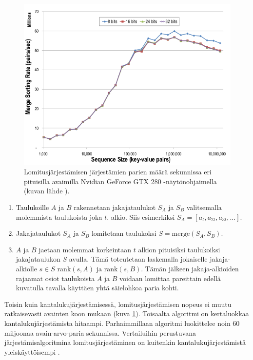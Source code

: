 \documentclass[a4paper,11pt]{article}
\begin{document}
\begin{figure}
\centering
\includegraphics[scale = 0.45]{satish_mergesort}
\caption{Lomitusjärjestämisen järjestämien parien määrä sekunnissa eri pituisilla avaimilla Nvidian GeForce GTX 280 -näytönohjaimella (kuvan lähde \cite{satish2009}).}
\label{fig:merge_sort_varying_key_size}
\end{figure}

\begin{singlespace*}
\begin{enumerate}
\item Taulukoille $A$ ja $B$ rakennetaan jakajataulukot $S_A$ ja $S_B$ valitsemalla molemmista taulukoista joka $t$. alkio. Siis esimerkiksi $S_A = [a_t, a_{2t}, a_{3t}, ...]$.
\item Jakajataulukot $S_A$ ja $S_B$ lomitetaan taulukoksi $S = \mathrm{merge}(S_A, S_B)$.
\item $A$ ja $B$ jaetaan molemmat korkeintaan $t$ alkion pituisiksi taulukoiksi jakajataulukon $S$ avulla. Tämä toteutetaan laskemalla jokaiselle jakaja-alkiolle $s \in S$ $\mathrm{rank}(s, A)$ ja $\mathrm{rank}(s, B)$. Tämän jälkeen jakaja-alkioiden rajaamat osiot taulukoista $A$ ja $B$ voidaan lomittaa pareittain edellä kuvatulla tavalla käyttäen yhtä säielohkoa paria kohti.
\end{enumerate}
\end{singlespace*}

Toisin kuin kantalukujärjestämisessä, lomitusjärjestämisen nopeus ei muutu ratkaisevasti avainten koon mukaan (kuva \ref{fig:merge_sort_varying_key_size}). Toisaalta algoritmi on kertaluokkaa kantalukujärjestämista hitaampi. Parhaimmillaan algoritmi luokittelee noin 60 miljoonaa avain-arvo-paria sekunnissa. Vertailuihin perustuvana järjestämisalgoritmina lomitusjärjestäminen on kuitenkin kantalukujärjestämistä yleiskäyttöisempi \cite{clrs}.
\end{document}
